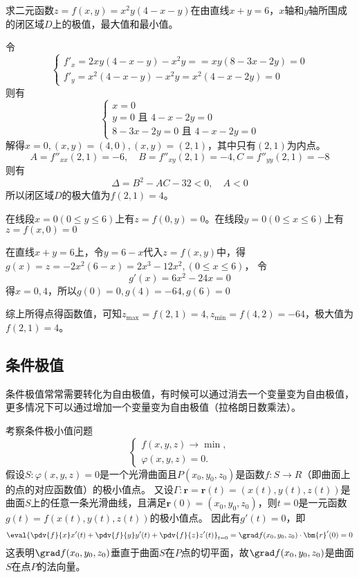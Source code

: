 \begin{example}
    求二元函数$z=f(x,y)=x^2y(4-x-y)$在由直线$x+y=6$，$x$轴和$y$轴所围成的闭区域$D$上的极值，最大值和最小值。
\end{example}
\begin{solution}
    令
    \[
        \begin{cases}
            f'_x  = 2xy(4-x-y) - x^2y = = xy(8-3x-2y) =  0 \\
            f'_y  = x^2(4-x-y) - x^2y = x^2(4-x-2y) = 0
        \end{cases}
    \]
    则有
    \[
        \begin{cases}
            x = 0                        \\
            y = 0 \text{ 且~} 4-x-2y = 0 \\
            8-3x-2y = 0 \text{ 且~} 4-x-2y = 0
        \end{cases}
    \]
    解得$x=0, (x,y)=(4,0), (x,y)=(2,1)$，其中只有$(2,1)$为内点。
    \[ A = f''_{xx}(2,1) = -6 ,\quad B = f''_{xy}(2,1) = -4, C = f''_{yy}(2,1) = -8 \]
    则有
    \[ \Delta = B^2 -AC -32 < 0,\quad A < 0 \]
    所以闭区域$D$的极大值为$f(2,1)=4$。

    在线段$x=0(0\leq y \leq 6)$上有$z=f(0,y)=0$。在线段$y=0(0\leq x\leq 6)$上有$z=f(x,0)=0$

    在直线$x+y=6$上，令$y=6-x$代入$z=f(x,y)$中，得$g(x) = z =-2x^2(6-x)=2x^3-12x^2,(0\leq x\leq 6)$，
    令
    \[ g'(x) = 6x^2 -24x =0 \]
    得$x = {0, 4}$，所以$g(0) = 0, g(4) = -64, g(6) = 0$

    综上所得点得函数值，可知$z_{\max} = f(2,1) = 4, z_{\min} = f(4,2) = -64$，极大值为$f(2,1)=4$。


\end{solution}

\subsection{条件极值}
条件极值常常需要转化为自由极值，有时候可以通过消去一个变量变为自由极值，更多情况下可以通过增加一个变量变为自由极值（拉格朗日数乘法）。

考察条件极小值问题
\[
    \begin{cases}
        f(x,y,z) \to \min, \\
        \varphi(x,y,z) = 0.
    \end{cases}
\]
假设$S:\varphi(x,y,z)=0$是一个光滑曲面且$P(x_0,y_0,z_0)$是函数$f:S\to R$（即曲面上的点的对应函数值）的极小值点。
又设$\Gamma : \bm{r} = \bm{r}(t) = (x(t),y(t),z(t))$是曲面$S$上的任意一条光滑曲线，且满足$\bm{r}(0)=(x_0,y_0,z_0)$，则$t=0$是一元函数$g(t)=f(x(t),y(t),z(t))$的极小值点。
因此有$g'(t)=0$，即
\[
    \eval{\pdv{f}{x}x'(t) + \pdv{f}{y}y'(t) + \pdv{f}{z}z'(t)}_{t=0}
    =
    \grad f(x_0,y_0,z_0) \cdot \bm{r}'(0) = 0
\]
这表明$\grad f(x_0,y_0,z_0)$垂直于曲面$S$在$P$点的切平面，故$\grad f(x_0,y_0,z_0)$是曲面$S$在点$P$的法向量。

